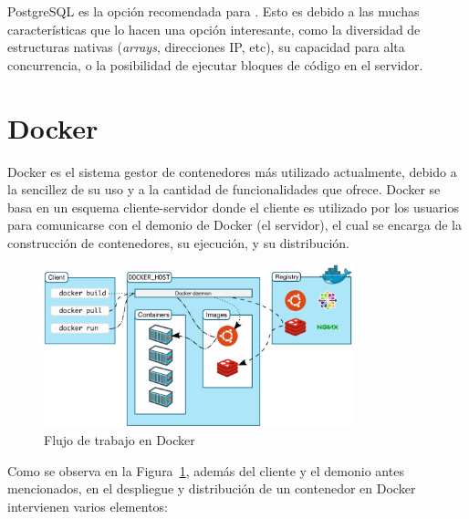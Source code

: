 PostgreSQL es la opción recomendada para . Esto es debido a las muchas características que lo hacen una opción interesante, como la diversidad de estructuras nativas (\emph{arrays}, direcciones IP, etc), su capacidad para alta concurrencia, o la posibilidad de ejecutar bloques de código en el servidor.


\section{Docker}\label{sec:docker}

Docker es el sistema gestor de contenedores más utilizado actualmente, debido a la sencillez de su uso y a la cantidad de funcionalidades que ofrece. Docker se basa en un esquema cliente-servidor donde el cliente es utilizado por los usuarios para comunicarse con el demonio de Docker (el servidor), el cual se encarga de la construcción de contenedores, su ejecución, y su distribución. \emph{\parencite{Reference20}}

\begin{figure}[ht]
    \centering
    \includegraphics[width=0.8\textwidth]{Figures/docker-workflow}
    \decoRule
    \caption[Docker (\emph{Workflow})]{Flujo de trabajo en Docker \emph{\parencite{Reference20}}}
    \label{fig:docker-workflow}
\end{figure}

Como se observa en la Figura~\ref{fig:docker-workflow}, además del cliente y el demonio antes mencionados, en el despliegue y distribución de un contenedor en Docker intervienen varios elementos:

